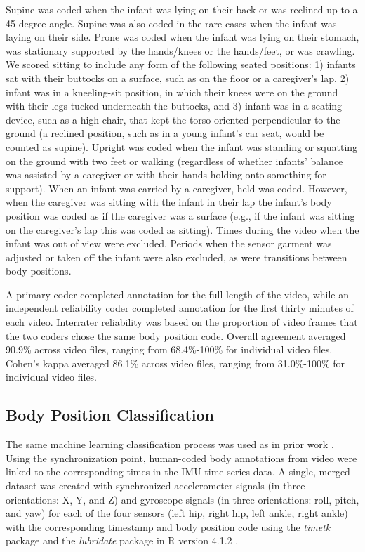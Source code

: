 \documentclass[
  man]{apa6}
\begin{document}
Supine was coded when the infant was lying on their back or was reclined up to a 45 degree angle. Supine was also coded in the rare cases when the infant was laying on their side. Prone was coded when the infant was lying on their stomach, was stationary supported by the hands/knees or the hands/feet, or was crawling. We scored sitting to include any form of the following seated positions: 1) infants sat with their buttocks on a surface, such as on the floor or a caregiver's lap, 2) infant was in a kneeling-sit position, in which their knees were on the ground with their legs tucked underneath the buttocks, and 3) infant was in a seating device, such as a high chair, that kept the torso oriented perpendicular to the ground (a reclined position, such as in a young infant's car seat, would be counted as supine). Upright was coded when the infant was standing or squatting on the ground with two feet or walking (regardless of whether infants' balance was assisted by a caregiver or with their hands holding onto something for support). When an infant was carried by a caregiver, held was coded. However, when the caregiver was sitting with the infant in their lap the infant's body position was coded as if the caregiver was a surface (e.g., if the infant was sitting on the caregiver's lap this was coded as sitting). Times during the video when the infant was out of view were excluded. Periods when the sensor garment was adjusted or taken off the infant were also excluded, as were transitions between body positions.

A primary coder completed annotation for the full length of the video, while an independent reliability coder completed annotation for the first thirty minutes of each video. Interrater reliability was based on the proportion of video frames that the two coders chose the same body position code. Overall agreement averaged 90.9\% across video files, ranging from 68.4\%-100\% for individual video files. Cohen's kappa averaged 86.1\% across video files, ranging from 31.0\%-100\% for individual video files.

\hypertarget{body-position-classification}{%
\subsection{Body Position Classification}\label{body-position-classification}}

The same machine learning classification process was used as in prior work \autocite{FranchakScott2021}. Using the synchronization point, human-coded body annotations from video were linked to the corresponding times in the IMU time series data. A single, merged dataset was created with synchronized accelerometer signals (in three orientations: X, Y, and Z) and gyroscope signals (in three orientations: roll, pitch, and yaw) for each of the four sensors (left hip, right hip, left ankle, right ankle) with the corresponding timestamp and body position code using the \emph{timetk} package \autocite{DanchoVaughan2023} and the \emph{lubridate} package \autocite{GrolemundWickham2011} in R version 4.1.2 \autocite{R42}.
\end{document}
